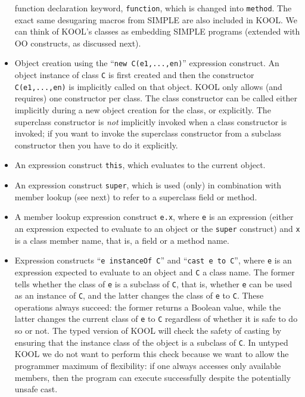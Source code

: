 \begin{latexComment}
\begin{itemize}
function declaration keyword, \texttt{function}, which is changed into
\texttt{method}.  The exact same desugaring macros from SIMPLE are
also included in KOOL.  We can think of KOOL's classes as embedding
SIMPLE programs (extended with OO constructs, as discussed next).
\item Object creation using the ``\texttt{new C(e1,...,en)}'' expression
construct.  An object instance of class \texttt{C} is first created and then
the constructor \texttt{C(e1,...,en)} is implicitly called on that
object.  KOOL only allows (and requires) one constructor per class.
The class constructor can be called either implicitly during a new
object creation for the class, or explicitly.  The superclass
constructor is {\em not} implicitly invoked when a class constructor
is invoked; if you want to invoke the superclass constructor from a
subclass constructor then you have to do it explicitly.
\item An expression construct \texttt{this}, which evaluates to the current
object.
\item An expression construct \texttt{super}, which is used (only) in
combination with member lookup (see next) to refer to a superclass field or
method.
\item A member lookup expression construct \texttt{e.x}, where \texttt{e}
is an expression (either an expression expected to evaluate to an object
or the \texttt{super} construct) and \texttt{x} is a class member name,
that is, a field or a method name.
\item Expression constructs ``\texttt{e instanceOf C}'' and
``\texttt{cast e to C}'', where \texttt{e} is an expression expected
to evaluate to an object and \texttt{C} a class name.  The former
tells whether the class of \texttt{e} is a subclass of \texttt{C},
that is, whether \texttt{e} can be used as an instance of \texttt{C},
and the latter changes the class of \texttt{e} to \texttt{C}.  These
operations always succeed: the former returns a Boolean value, while
the latter changes the current class of \texttt{e} to \texttt{C}
regardless of whether it is safe to do so or not.  The typed version
of KOOL will check the safety of casting by ensuring that the instance
class of the object is a subclass of \texttt{C}.  In untyped KOOL we
do not want to perform this check because we want to allow the
programmer maximum of flexibility: if one always accesses only
available members, then the program can execute successfully despite
the potentially unsafe cast.
\end{itemize}


\end{latexComment}
